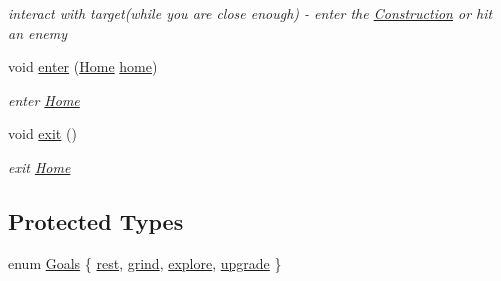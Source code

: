 \begin{DoxyCompactItemize}
\begin{DoxyCompactList}\small\item\em interact with target(while you are close enough) -\/ enter the \hyperlink{class_construction}{Construction} or hit an enemy \end{DoxyCompactList}\item 
void \hyperlink{class_mob_a014041e72f2c65a2eabe313e3f175de0}{enter} (\hyperlink{class_home}{Home} \hyperlink{class_mob_ad3824bdc42d4041e184201c7801ab35e}{home})\hypertarget{class_mob_a014041e72f2c65a2eabe313e3f175de0}{}\label{class_mob_a014041e72f2c65a2eabe313e3f175de0}

\begin{DoxyCompactList}\small\item\em enter \hyperlink{class_home}{Home} \end{DoxyCompactList}\item 
void \hyperlink{class_mob_aeac9e7dd6c5da44ad88f3458019c66ab}{exit} ()\hypertarget{class_mob_aeac9e7dd6c5da44ad88f3458019c66ab}{}\label{class_mob_aeac9e7dd6c5da44ad88f3458019c66ab}

\begin{DoxyCompactList}\small\item\em exit \hyperlink{class_home}{Home} \end{DoxyCompactList}\end{DoxyCompactItemize}
\subsection*{Protected Types}
\begin{DoxyCompactItemize}
\item 
enum \hyperlink{class_mob_a886346a9f913203df0797f2c84dd8962}{Goals} \{ \hyperlink{class_mob_a886346a9f913203df0797f2c84dd8962a3d18c0a90658cc4872eed0afe28790b4}{rest}, 
\hyperlink{class_mob_a886346a9f913203df0797f2c84dd8962aa72b321b37507255070e236e133616f9}{grind}, 
\hyperlink{class_mob_a886346a9f913203df0797f2c84dd8962a114d85e85d882dd8bf2be34208450b6c}{explore}, 
\hyperlink{class_mob_a886346a9f913203df0797f2c84dd8962ac9be3f62a039d2a4c5a63146a03a307d}{upgrade}
 \}
\end{DoxyCompactItemize}

